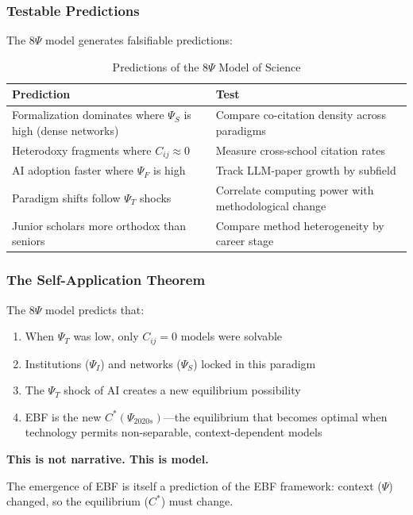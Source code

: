 \subsubsection{Testable Predictions}

The 8$\Psi$ model generates falsifiable predictions:

\begin{table}[htbp]
\centering
\caption{Predictions of the 8$\Psi$ Model of Science}
\label{tab:8psi-predictions}
\renewcommand{\arraystretch}{1.3}
\small
\begin{tabular}{@{}p{6cm}p{6cm}@{}}
\toprule
\textbf{Prediction} & \textbf{Test} \\
\midrule
Formalization dominates where $\Psi_S$ is high (dense networks) &
    Compare co-citation density across paradigms \\
Heterodoxy fragments where $C_{ij} \approx 0$ &
    Measure cross-school citation rates \\
AI adoption faster where $\Psi_F$ is high &
    Track LLM-paper growth by subfield \\
Paradigm shifts follow $\Psi_T$ shocks &
    Correlate computing power with methodological change \\
Junior scholars more orthodox than seniors &
    Compare method heterogeneity by career stage \\
\bottomrule
\end{tabular}
\end{table}

\subsubsection{The Self-Application Theorem}

\begin{tcolorbox}[colback=blue!5!white, colframe=blue!75!black,
    title=\textbf{EBF Explains Its Own Emergence}]

The 8$\Psi$ model predicts that:

\begin{enumerate}[nosep]
    \item When $\Psi_T$ was low, only $C_{ij} = 0$ models were solvable
    \item Institutions ($\Psi_I$) and networks ($\Psi_S$) locked in this paradigm
    \item The $\Psi_T$ shock of AI creates a new equilibrium possibility
    \item EBF is the new $C^*(\Psi_{2020s})$---the equilibrium that becomes
        optimal when technology permits non-separable, context-dependent models
\end{enumerate}

\textbf{This is not narrative. This is model.}

The emergence of EBF is itself a prediction of the EBF framework:
context ($\Psi$) changed, so the equilibrium ($C^*$) must change.

\end{tcolorbox}

